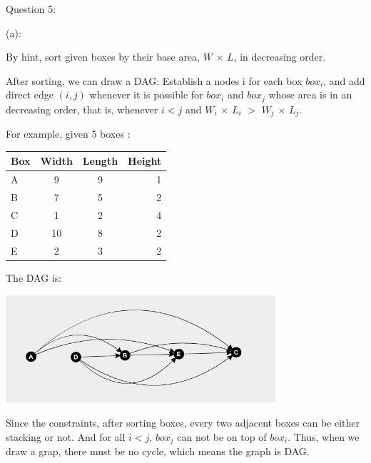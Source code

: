 \documentclass[12pt]{article}
\begin{document}
\pagebreak
\noindent
\large Question 5: \par
\large (a): \par
\normalsize 
By hint, sort given boxes by their base area, $W$ $\times$ $L$, in decreasing order. \par
After sorting, we can draw a DAG: 
Establish a nodes i for each box $box_i$, and add direct edge $(i, j)$ whenever it is possible for $box_i$ and $box_j$ whose area is in an decreasing order, 
that is, whenever $i < j$ and $W_i$ $\times$ $L_i$ $>$ $W_j$ $\times$ $L_j$. \par
For example, given 5 boxes :

	\begin{table}[h!]
	  \begin{center}
	    \label{tab:table1}
	    \begin{tabular}{l|c|c|r}
	      \textbf{Box} & \textbf{Width} & \textbf{Length} & \textbf{Height}\\
	      \hline
	      A & 9 & 9 & 1\\
	      B & 7 & 5 & 2\\
	      C & 1 & 2 & 4\\
	      D & 10 & 8 & 2\\
	      E & 2 & 3 & 2\\
	    \end{tabular}
	  \end{center}
	\end{table} \par
The DAG is: \par
\includegraphics[width=10cm, height=4cm]{question5a} 
\\
\par
Since the constraints, after sorting boxes, every two adjacent boxes can be either stacking or not. And for all $i < j$, $box_j$ can not be on top of $box_i$.
Thus, when we draw a grap, there must be no cycle, which means the graph is DAG.
\end{document}
